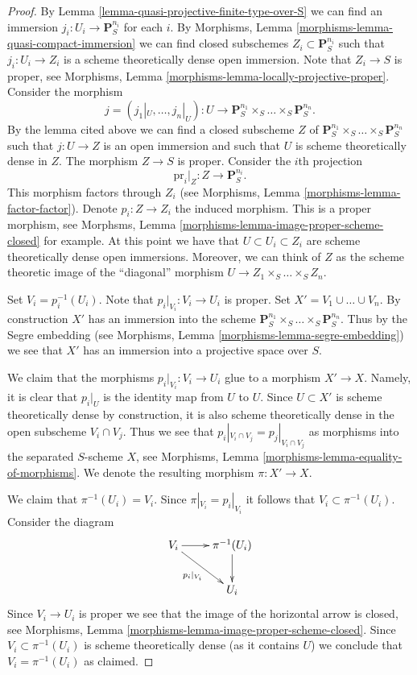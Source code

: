 \begin{proof}
\medskip\noindent
By Lemma \ref{lemma-quasi-projective-finite-type-over-S}
we can find an immersion $j_i : U_i \to \mathbf{P}_S^{n_i}$
for each $i$. By
Morphisms, Lemma \ref{morphisms-lemma-quasi-compact-immersion} we can find
closed subschemes $Z_i \subset \mathbf{P}_S^{n_i}$
such that $j_i : U_i \to Z_i$ is a scheme theoretically
dense open immersion. Note that $Z_i \to S$ is proper, see
Morphisms, Lemma \ref{morphisms-lemma-locally-projective-proper}.
Consider the morphism
$$
j = (j_1|_U, \ldots, j_n|_U) : U \longrightarrow
\mathbf{P}_S^{n_1} \times_S \ldots \times_S \mathbf{P}_S^{n_n}.
$$
By the lemma cited above we can find a closed subscheme
$Z$ of $\mathbf{P}_S^{n_1} \times_S \ldots \times_S \mathbf{P}_S^{n_n}$
such that $j : U \to Z$ is an open immersion and such that $U$
is scheme theoretically dense in $Z$. The morphism $Z \to S$
is proper. Consider the $i$th projection
$$
\text{pr}_i|_Z : Z \longrightarrow \mathbf{P}^{n_i}_S.
$$
This morphism factors through $Z_i$ (see Morphisms,
Lemma \ref{morphisms-lemma-factor-factor}). Denote $p_i : Z \to Z_i$
the induced morphism. This is a proper morphism, see
Morphsms, Lemma \ref{morphisms-lemma-image-proper-scheme-closed}
for example. At this point we have that
$U \subset U_i \subset Z_i$ are scheme theoretically
dense open immersions. Moreover, we can think of $Z$ as the
scheme theoretic image of the ``diagonal'' morphism
$U \to Z_1 \times_S \ldots \times_S Z_n$.

\medskip\noindent
Set $V_i = p_i^{-1}(U_i)$. Note that $p_i|_{V_i} : V_i \to U_i$ is proper.
Set $X' = V_1 \cup \ldots \cup V_n$. By construction $X'$ has an immersion
into the scheme
$\mathbf{P}^{n_1}_S \times_S \ldots \times_S \mathbf{P}^{n_n}_S$.
Thus by the Segre embedding (see
Morphisms, Lemma \ref{morphisms-lemma-segre-embedding}) we see that $X'$ has
an immersion into a projective space over $S$.

\medskip\noindent
We claim that the morphisms $p_i|_{V_i}: V_i \to U_i$ glue to a morphism
$X' \to X$. Namely, it is clear that $p_i|_U$ is the identity map
from $U$ to $U$. Since $U \subset X'$ is scheme theoretically
dense by construction, it is also scheme theoretically dense
in the open subscheme $V_i \cap V_j$. Thus we see that
$p_i|_{V_i \cap V_j} = p_j|_{V_i \cap V_j}$ as morphisms into the
separated $S$-scheme $X$, see
Morphisms, Lemma \ref{morphisms-lemma-equality-of-morphisms}.
We denote the resulting morphism $\pi : X' \to X$.

\medskip\noindent
We claim that $\pi^{-1}(U_i) = V_i$.
Since $\pi|_{V_i} = p_i|_{V_i}$ it follows that
$V_i \subset \pi^{-1}(U_i)$. Consider the diagram
$$
\xymatrix{
V_i \ar[r] \ar[rd]_{p_i|_{V_i}} & \pi^{-1}(U_i) \ar[d] \\
& U_i
}
$$
Since $V_i \to U_i$ is proper we see that the image of
the horizontal arrow is closed, see
Morphisms, Lemma \ref{morphisms-lemma-image-proper-scheme-closed}.
Since $V_i \subset \pi^{-1}(U_i)$ is scheme
theoretically dense (as it contains $U$)
we conclude that $V_i = \pi^{-1}(U_i)$ as claimed.


\end{proof}
